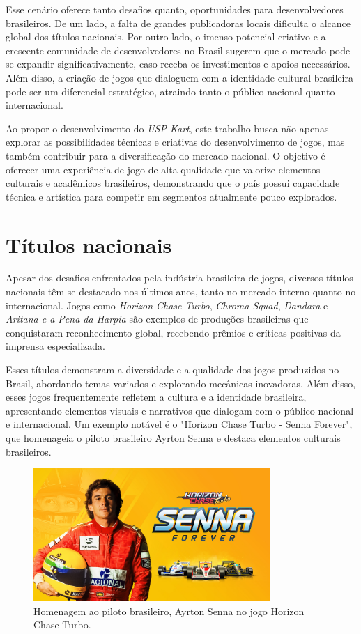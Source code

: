 Esse cenário oferece tanto desafios quanto, oportunidades para desenvolvedores brasileiros. De um lado, a falta de grandes publicadoras locais dificulta o alcance global dos títulos nacionais. Por outro lado, o imenso potencial criativo e a crescente comunidade de desenvolvedores no Brasil sugerem que o mercado pode se expandir significativamente, caso receba os investimentos e apoios necessários. Além disso, a criação de jogos que dialoguem com a identidade cultural brasileira pode ser um diferencial estratégico, atraindo tanto o público nacional quanto internacional.

Ao propor o desenvolvimento do \textit{USP Kart}, este trabalho busca não apenas explorar as possibilidades técnicas e criativas do desenvolvimento de jogos, mas também contribuir para a diversificação do mercado nacional. O objetivo é oferecer uma experiência de jogo de alta qualidade que valorize elementos culturais e acadêmicos brasileiros, demonstrando que o país possui capacidade técnica e artística para competir em segmentos atualmente pouco explorados.

\section{Títulos nacionais}
Apesar dos desafios enfrentados pela indústria brasileira de jogos, diversos títulos nacionais têm se destacado nos últimos anos, tanto no mercado interno quanto no internacional. Jogos como \textit{Horizon Chase Turbo}, \textit{Chroma Squad}, \textit{Dandara} e \textit{Aritana e a Pena da Harpia} são exemplos de produções brasileiras que conquistaram reconhecimento global, recebendo prêmios e críticas positivas da imprensa especializada.

Esses títulos demonstram a diversidade e a qualidade dos jogos produzidos no Brasil, abordando temas variados e explorando mecânicas inovadoras. Além disso, esses jogos frequentemente refletem a cultura e a identidade brasileira, apresentando elementos visuais e narrativos que dialogam com o público nacional e internacional. Um exemplo notável é o "Horizon Chase Turbo - Senna Forever", que homenageia o piloto brasileiro Ayrton Senna e destaca elementos culturais brasileiros.

\begin{figure}[H]
    \centering
    \includegraphics[width=0.8\textwidth]{figuras/Horizon Chase Turbo - Senna.jpg}
    \caption{Homenagem ao piloto brasileiro, Ayrton Senna no jogo Horizon Chase Turbo. \cite{horizonChaseTurbo}}
    \label{fig:horizon-chase-turbo-senna}
\end{figure}

